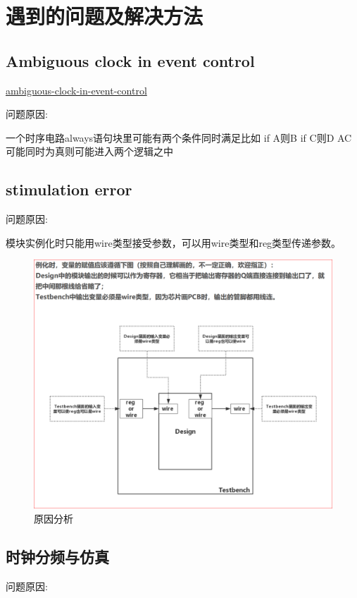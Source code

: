 \documentclass[UTF8]{article}
\begin{document}
\section{遇到的问题及解决方法}
\subsection{Ambiguous clock in event control}

\href{https://stackoverflow.com/questions/27145548/ambiguous-clock-in-event-control}{ambiguous-clock-in-event-control} 

问题原因: 

一个时序电路always语句块里可能有两个条件同时满足比如
    if A则B
    if C则D
AC可能同时为真则可能进入两个逻辑之中

\subsection{stimulation error}
问题原因:

模块实例化时只能用wire类型接受参数，可以用wire类型和reg类型传递参数。

\begin{figure}[H]
    \centering
    \includegraphics[width=\linewidth]{0.PNG}
    \caption{原因分析}
    \label{FIG.12}
\end{figure}

\subsection{时钟分频与仿真}
问题原因: 
\end{document}
